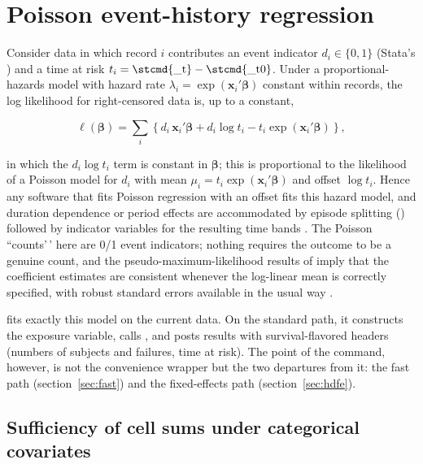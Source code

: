 \documentclass[12pt,a4paper]{article}
\begin{document}
\section{Poisson event-history regression}

\label{sec:model}

Consider  data in which record \(i\) contributes an event
indicator \(d_i \in \{0, 1\}\) (Stata's ) and a time at risk
\(t_i = \mbox{\stcmd{\_t}} - \mbox{\stcmd{\_t0}}\). Under a
proportional-hazards model with hazard rate
\(\lambda_i = \exp(\mathbf{x}_i'\bm{\beta})\) constant within records,
the log likelihood for right-censored data is, up to a constant,

\begin{equation*}
\ell(\bm{\beta}) = \sum_i \left\{ d_i \, \mathbf{x}_i'\bm{\beta}
  + d_i \log t_i - t_i \exp(\mathbf{x}_i'\bm{\beta}) \right\},
\end{equation*}

in which the \(d_i \log t_i\) term is constant in \(\bm{\beta}\); this
is proportional to the likelihood of a Poisson model for \(d_i\) with
mean \(\mu_i = t_i \exp(\mathbf{x}_i'\bm{\beta})\) and offset
\(\log t_i\). Hence any software that fits Poisson regression with an
offset fits this hazard model, and duration dependence or period effects
are accommodated by episode splitting () followed by
indicator variables for the resulting time bands
\citep{holford1980, laird1981}. The Poisson ``counts'\,' here are 0/1
event indicators; nothing requires the outcome to be a genuine count,
and the pseudo-maximum-likelihood results of \citet{gourieroux1984}
imply that the coefficient estimates are consistent whenever the
log-linear mean is correctly specified, with robust standard errors
available in the usual way \citep[see also][]{santos2006}.

 fits exactly this model on the current 
data. On the standard path, it constructs the exposure variable, calls
, and posts results with survival-flavored headers
(numbers of subjects and failures, time at risk). The point of the
command, however, is not the convenience wrapper but the two departures
from it: the fast path (section~\ref{sec:fast}) and the
fixed-effects path (section~\ref{sec:hdfe}).

\subsection{Sufficiency of cell sums under categorical
covariates}\label{sufficiency-of-cell-sums-under-categorical-covariates}
\end{document}

